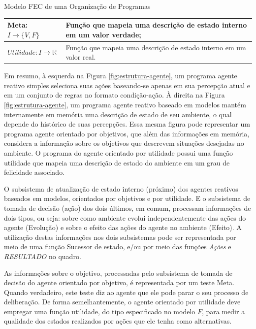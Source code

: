 \begin{section}{Modelo FEC de uma Organização de Programas}
\begin{table}[h!]
{\begin{tabular}{| p{4cm} | p{10cm}|}
                Meta:$I \rightarrow \{V,F\}$ & Função que mapeia uma descrição de estado interno em um valor verdade;  \\ \hline
                 
                $Utilidade: I \rightarrow \mathbb{R}$ & Função que mapeia uma descrição de estado interno em um valor real. \\ 
                \hline
                \end{tabular}
            }{
        }
        \end{table}
        
        Em resumo, à esquerda na Figura \ref{fig:estrutura-agente}, um programa agente reativo simples seleciona suas ações baseando-se apenas em sua percepção atual e em um conjunto de regras no formato condição-ação. À direita na Figura \ref{fig:estrutura-agente}, um programa agente reativo baseado em modelos mantém internamente em memória uma descrição de estado de seu ambiente, o qual depende do histórico de suas percepções. Essa mesma figura pode representar um programa agente orientado por objetivos, que além das informações em memória, considera a informação sobre os objetivos que descrevem situações desejadas no ambiente. O programa do agente orientado por utilidade possui uma função utilidade que mapeia uma descrição de estado do ambiente em um grau de felicidade associado. 
    
        O subsistema de atualização de estado interno (próximo) dos agentes reativos baseados em modelos, orientados por objetivos e por utilidade. E o subsistema de tomada de decisão (ação) dos dois últimos, em comum, processam informações de dois tipos, ou seja: sobre como ambiente evolui independentemente das ações do agente (Evolução) e sobre o efeito das ações do agente no ambiente (Efeito). A utilização destas informações nos dois subsistemas pode ser representada por meio de uma função Sucessor de estado, e/ou por meio das funções \emph{Ações} e \emph{RESULTADO} no quadro.
        
        As informações sobre o objetivo, processadas pelo subsistema de tomada de decisão do agente orientado por objetivo, é representada por um teste Meta. Quando verdadeiro, este teste diz ao agente que ele pode parar o seu processo de deliberação. De forma semelhantemente, o agente orientado por utilidade deve empregar uma função utilidade, do tipo especificado no modelo $F$, para medir a qualidade dos estados realizados por ações que ele tenha como alternativas.
        

\end{section}
